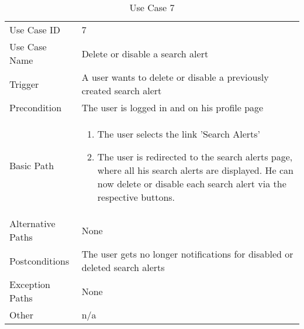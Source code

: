 \begin{table}[H]
\centering
\label{table-use-case-7}
\begin{tabular}{|p{3cm}|p{10cm}}
Use Case ID       & 7                                                         \\
Use Case Name     & Delete or disable a search alert                                      \\
Trigger           & A user wants to delete or disable a previously created search alert	\\
Precondition      & The user is logged in and on his profile page               \\
Basic Path        & \begin{enumerate}
\item The user selects the link 'Search Alerts'
\item The user is redirected to the search alerts page, where all his search
alerts are displayed. He can now delete or disable each search alert via the
respective buttons. 
\end{enumerate} 
     \\
Alternative Paths & None                          \\
Postconditions    & The user gets no longer notifications for disabled or deleted search alerts		\\
Exception Paths   & None			\\
Other             & n/a                                                                                                                                                                                                        
\end{tabular}
\caption{Use Case 7}
\end{table}